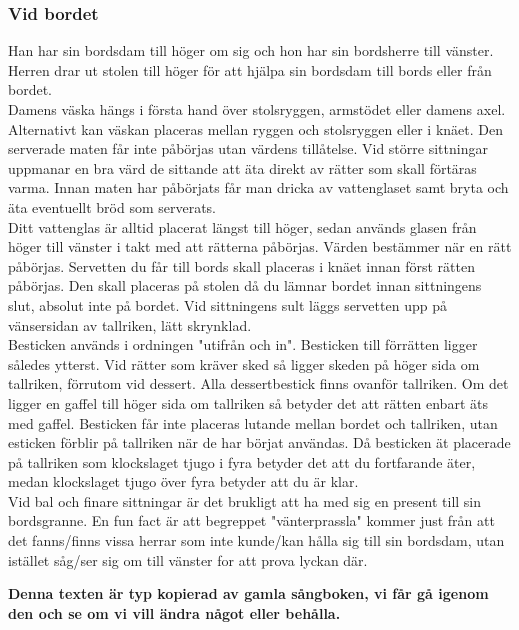 \subsubsection*{Vid bordet}
Han har sin bordsdam till höger om sig och hon har sin bordsherre till vänster.
Herren drar ut stolen till höger för att hjälpa sin bordsdam till bords eller från bordet.
\\

Damens väska hängs i första hand över stolsryggen, armstödet eller damens axel.
Alternativt kan väskan placeras mellan ryggen och stolsryggen eller i knäet.
Den serverade maten får inte påbörjas utan värdens tillåtelse.
Vid större sittningar uppmanar en bra värd de sittande att äta direkt av rätter som skall förtäras varma.
Innan maten har påbörjats får man dricka av vattenglaset samt bryta och äta eventuellt bröd som serverats.
\\

Ditt vattenglas är alltid placerat längst till höger, sedan används glasen från höger till vänster i takt med att rätterna påbörjas.
Värden bestämmer när en rätt påbörjas.
Servetten du får till bords skall placeras i knäet innan först rätten påbörjas. Den skall placeras på stolen då du lämnar bordet innan sittningens slut, absolut inte på bordet.
Vid sittningens sult läggs servetten upp på vänsersidan av tallriken, lätt skrynklad.
\\

Besticken används i ordningen "utifrån och in".
Besticken till förrätten ligger således ytterst.
Vid rätter som kräver sked så ligger skeden på höger sida om tallriken, förrutom vid dessert.
Alla dessertbestick finns ovanför tallriken.
Om det ligger en gaffel till höger sida om tallriken så betyder det att rätten enbart äts med gaffel.
Besticken får inte placeras lutande mellan bordet och tallriken, utan esticken förblir på tallriken när de har börjat användas. 
Då besticken ät placerade på tallriken som klockslaget tjugo i fyra betyder det att du fortfarande äter,
medan klockslaget tjugo över fyra betyder att du är klar.
\\

Vid bal och finare sittningar är det brukligt att ha med sig en present till sin bordsgranne. 
En fun fact är att begreppet "vänterprassla" kommer just från att det fanns/finns vissa herrar som inte kunde/kan hålla sig till sin bordsdam, 
utan istället såg/ser sig om till vänster for att prova lyckan där.

\textbf{Denna texten är typ kopierad av gamla sångboken, vi får gå igenom den och se om vi vill ändra något eller behålla.}
\\
\\
\\

